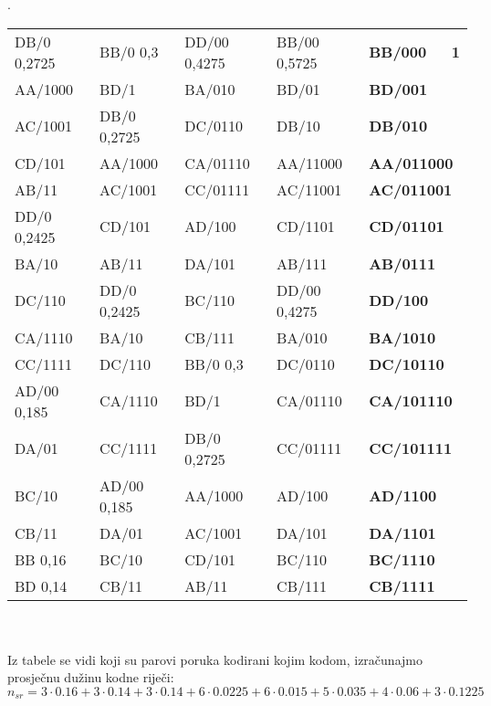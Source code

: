 \documentclass[12pt]{article}
\begin{document}
\begin{enumerate}
\newpage
.
\\
\begin{tabular}{|l|l|l|l|l|}
\hline
DB/0 0,2725 & BB/0 0,3    & DD/00 0,4275 & BB/00 0,5725 & \textbf{BB/000~~~1}  \\
AA/1000     & BD/1        & BA/010       & BD/01        & \textbf{BD/001}    \\ \cline{2-2}
AC/1001     & DB/0 0,2725 & DC/0110      & DB/10        & \textbf{DB/010}    \\
CD/101      & AA/1000     & CA/01110     & AA/11000     & \textbf{AA/011000} \\
AB/11       & AC/1001     & CC/01111     & AC/11001     & \textbf{AC/011001} \\ \cline{1-1}
DD/0 0,2425 & CD/101      & AD/100       & CD/1101      & \textbf{CD/01101}  \\
BA/10       & AB/11       & DA/101       & AB/111       & \textbf{AB/0111}   \\ \cline{2-2} \cline{4-4}
DC/110      & DD/0 0,2425 & BC/110       & DD/00 0,4275 & \textbf{DD/100}    \\
CA/1110     & BA/10       & CB/111       & BA/010       & \textbf{BA/1010}   \\ \cline{3-3}
CC/1111     & DC/110      & BB/0 0,3     & DC/0110      & \textbf{DC/10110}  \\ \cline{1-1}
AD/00 0,185 & CA/1110     & BD/1         & CA/01110     & \textbf{CA/101110} \\ \cline{3-3}
DA/01       & CC/1111     & DB/0 0,2725  & CC/01111     & \textbf{CC/101111} \\ \cline{2-2}
BC/10       & AD/00 0,185 & AA/1000      & AD/100       & \textbf{AD/1100}   \\
CB/11       & DA/01       & AC/1001      & DA/101       & \textbf{DA/1101}   \\ \cline{1-1}
BB 0,16     & BC/10       & CD/101       & BC/110       & \textbf{BC/1110}   \\ \cline{1-1}
BD 0,14     & CB/11       & AB/11        & CB/111       & \textbf{CB/1111}   \\ \hline
\end{tabular}
\\
\\
Iz tabele se vidi koji su parovi poruka kodirani kojim kodom, izračunajmo
prosječnu dužinu kodne riječi:
\begin{equation*}
    n_{sr} = 3 \cdot  0.16 + 3 \cdot 0.14 + 3 \cdot 0.14 +  6 \cdot 0.0225 + 6 \cdot 0.015 +
    5 \cdot  0.035 + 4 \cdot 0.06 + 3 \cdot 0.1225 

\end{equation*}
\end{enumerate}
\end{document}
